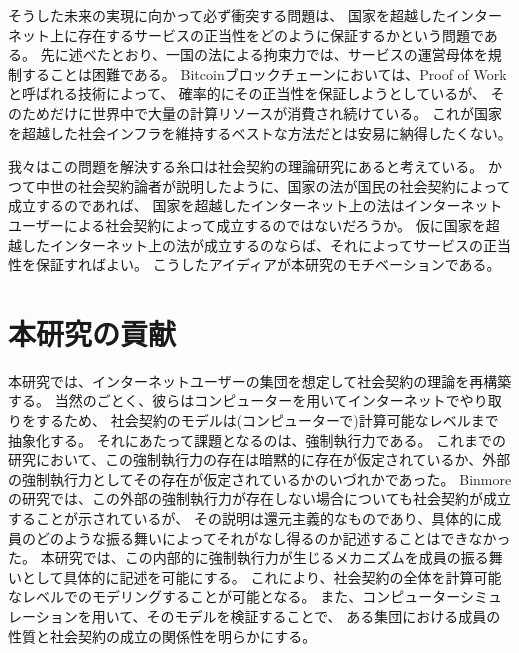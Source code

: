   そうした未来の実現に向かって必ず衝突する問題は、
  国家を超越したインターネット上に存在するサービスの正当性をどのように保証するかという問題である。
  先に述べたとおり、一国の法による拘束力では、サービスの運営母体を規制することは困難である。
  Bitcoinブロックチェーンにおいては、Proof of Workと呼ばれる技術によって、
  確率的にその正当性を保証しようとしているが、
  そのためだけに世界中で大量の計算リソースが消費され続けている。
  これが国家を超越した社会インフラを維持するベストな方法だとは安易に納得したくない。

  我々はこの問題を解決する糸口は社会契約の理論研究にあると考えている。
  かつて中世の社会契約論者が説明したように、国家の法が国民の社会契約によって成立するのであれば、
  国家を超越したインターネット上の法はインターネットユーザーによる社会契約によって成立するのではないだろうか。
  仮に国家を超越したインターネット上の法が成立するのならば、それによってサービスの正当性を保証すればよい。
  こうしたアイディアが本研究のモチベーションである。

  \section{本研究の貢献}
  本研究では、インターネットユーザーの集団を想定して社会契約の理論を再構築する。
  当然のごとく、彼らはコンピューターを用いてインターネットでやり取りをするため、
  社会契約のモデルは(コンピューターで)計算可能なレベルまで抽象化する。
  それにあたって課題となるのは、強制執行力である。
  これまでの研究において、この強制執行力の存在は暗黙的に存在が仮定されているか、外部の強制執行力としてその存在が仮定されているかのいづれかであった。
  Binmoreの研究では、この外部の強制執行力が存在しない場合についても社会契約が成立することが示されている\cite{binmore2005}が、
  その説明は還元主義的なものであり、具体的に成員のどのような振る舞いによってそれがなし得るのか記述することはできなかった。
  本研究では、この内部的に強制執行力が生じるメカニズムを成員の振る舞いとして具体的に記述を可能にする。
  これにより、社会契約の全体を計算可能なレベルでのモデリングすることが可能となる。
  また、コンピューターシミュレーションを用いて、そのモデルを検証することで、
  ある集団における成員の性質と社会契約の成立の関係性を明らかにする。

  
